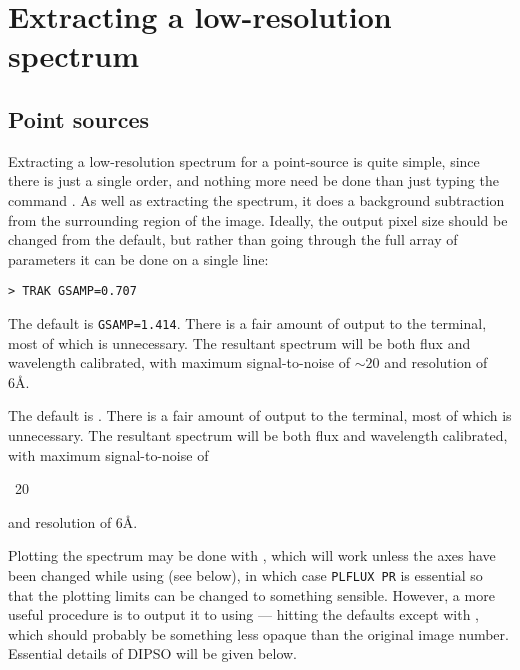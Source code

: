 \section{Extracting a low-resolution spectrum}

\subsection{Point sources}

Extracting a low-resolution spectrum for a point-source is quite simple,
since there is just a single order, and nothing more need be done than just
typing the command \@.  As well as extracting the
spectrum, it does a background subtraction from the surrounding region of the
image.  Ideally,
the output pixel size should be changed from the default, but rather than
going through the full array of parameters it can be done on a single line:

\begin{verbatim}
> TRAK GSAMP=0.707
\end{verbatim}

\begin{latexonly}
The default is \verb+GSAMP=1.414+\@.  There is a fair amount of output to the
terminal, most of which is unnecessary.  The resultant spectrum will be both
flux and wavelength calibrated, with maximum signal-to-noise of $\sim 20$ and
resolution of 6\AA\@.
\end{latexonly}

\begin{htmlonly}
The default is \@.  There is a fair
amount of output to the
terminal, most of which is unnecessary.  The resultant spectrum will be both
flux and wavelength calibrated, with maximum signal-to-noise of
\begin{rawhtml}~20\end{rawhtml} and resolution of 6\AA\@.
\end{htmlonly}

Plotting the spectrum may be done with ,
which will work unless
the axes have been changed while using 
(see below), in which
case \verb+PLFLUX PR+ is essential so that the plotting limits can be changed
to something sensible.  However, a more useful procedure is to output it to
 using  ---
hitting the defaults except with
, which should probably be something less
opaque than the original image number.  Essential details of DIPSO will be
given below.


